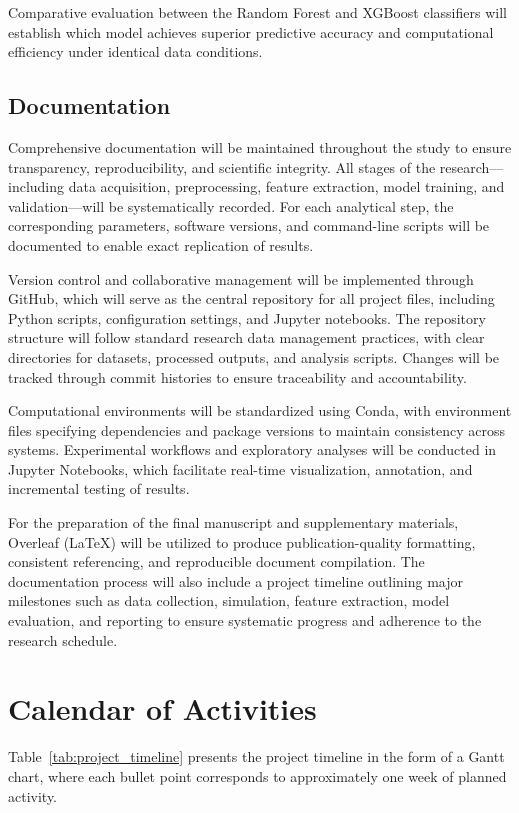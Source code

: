 Comparative evaluation between the Random Forest and XGBoost classifiers will establish which model achieves superior predictive accuracy and computational efficiency under identical data conditions.

\subsection{Documentation}

Comprehensive documentation will be maintained throughout the study to ensure transparency, reproducibility, and scientific integrity. All stages of the research—including data acquisition, preprocessing, feature extraction, model training, and validation—will be systematically recorded. For each analytical step, the corresponding parameters, software versions, and command-line scripts will be documented to enable exact replication of results.

Version control and collaborative management will be implemented through GitHub, which will serve as the central repository for all project files, including Python scripts, configuration settings, and Jupyter notebooks. The repository structure will follow standard research data management practices, with clear directories for datasets, processed outputs, and analysis scripts. Changes will be tracked through commit histories to ensure traceability and accountability.

Computational environments will be standardized using Conda, with environment files specifying dependencies and package versions to maintain consistency across systems. Experimental workflows and exploratory analyses will be conducted in Jupyter Notebooks, which facilitate real-time visualization, annotation, and incremental testing of results.

For the preparation of the final manuscript and supplementary materials, Overleaf (LaTeX) will be utilized to produce publication-quality formatting, consistent referencing, and reproducible document compilation. The documentation process will also include a project timeline outlining major milestones such as data collection, simulation, feature extraction, model evaluation, and reporting to ensure systematic progress and adherence to the research schedule.

\section{Calendar of Activities}

Table~\ref{tab:project_timeline} presents the project timeline in the form of a Gantt chart, where each bullet point corresponds to approximately one week of planned activity.

